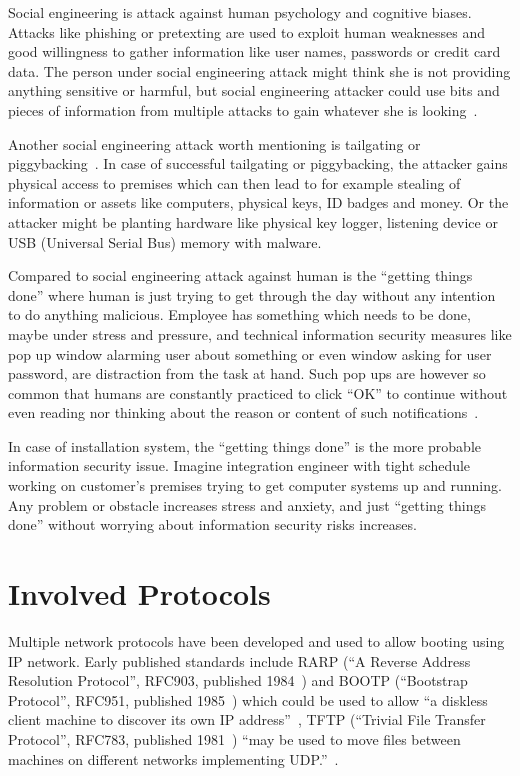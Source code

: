 Social engineering is attack against human psychology and cognitive
biases. Attacks like phishing or pretexting are used to exploit human
weaknesses and good willingness to gather information like user names,
passwords or credit card data. The person under social engineering
attack might think she is not providing anything sensitive or harmful,
but social engineering attacker could use bits and pieces of
information from multiple attacks to gain whatever she is
looking~\cite{greavu2014social}\cite{anderson}.

Another social engineering attack worth mentioning is tailgating or
piggybacking~\cite{fairbrother2014insider}. In case of successful
tailgating or piggybacking, the attacker gains physical access to
premises which can then lead to for example stealing of information or
assets like computers, physical keys, ID badges and money. Or the
attacker might be planting hardware like physical key logger, listening
device or USB (Universal Serial Bus) memory with malware.

Compared to social engineering attack against human is the ``getting
things done'' where human is just trying to get through the day
without any intention to do anything malicious. Employee has something
which needs to be done, maybe under stress and pressure, and technical
information security measures like pop up window alarming user about
something or even window asking for user password, are distraction
from the task at hand. Such pop ups are however so common that humans
are constantly practiced to click ``OK'' to continue without even
reading nor thinking about the reason or content of such
notifications~\cite{anderson}.

In case of installation system, the ``getting things done'' is the
more probable information security issue. Imagine integration engineer
with tight schedule working on customer's premises trying to get
computer systems up and running. Any problem or obstacle increases
stress and anxiety, and just ``getting things done'' without worrying
about information security risks increases.


\section{Involved Protocols}


Multiple network protocols have been developed and used to allow
booting using IP network. Early published standards include RARP (``A
Reverse Address Resolution Protocol'', RFC903, published
1984~\cite{RFC903}) and BOOTP (``Bootstrap Protocol'', RFC951,
published 1985~\cite{RFC951}) which could be used to allow ``a
diskless client machine to discover its own IP
address''~\cite{RFC951}, TFTP (``Trivial File Transfer Protocol'',
RFC783, published 1981~\cite{RFC783}) ``may be used to move files
between machines on different networks implementing
UDP.''~\cite{RFC783}.

